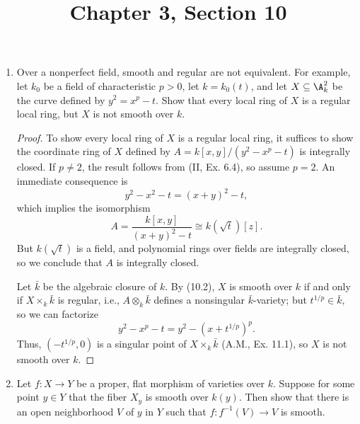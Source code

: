 \documentclass[a4paper]{article}
\title{Chapter 3, Section 10}
\begin{document}
\maketitle

\begin{enumerate} [label=\textbf{\arabic*.}, leftmargin=0em]

  \item Over a nonperfect field, smooth and regular are not equivalent.
        For example, let $k_0$ be a field of characteristic $p > 0$, let $k = k_0(t)$, and let $X \subseteq \A_k^2$ be the curve defined by $y^2 = x^p - t$.
        Show that every local ring of $X$ is a regular local ring, but $X$ is not smooth over $k$.

        \begin{proof}
          To show every local ring of $X$ is a regular local ring, it suffices to show the coordinate ring of $X$ defined by $A = k[x, y] / (y^2 - x^p - t)$ is integrally closed.
          If $p \neq 2$, the result follows from (II, Ex. 6.4), so assume $p = 2$.
          An immediate consequence is
          \begin{equation*}
            y^2 - x^2 - t = (x + y)^2 - t,
          \end{equation*}
          which implies the isomorphism
          \begin{equation*}
            A = \frac{k[x, y]}{(x + y)^2 - t} \cong k(\sqrt{t})[z].
          \end{equation*}
          But $k(\sqrt{t})$ is a field, and polynomial rings over fields are integrally closed, so we conclude that $A$ is integrally closed.

          Let $\bar{k}$ be the algebraic closure of $k$.
          By (10.2), $X$ is smooth over $k$ if and only if $X \times_k \bar{k}$ is regular, i.e., $A \otimes_k \bar{k}$ defines a nonsingular $\bar{k}$-variety; but $t^{1/p} \in \bar{k}$, so we can factorize
          \begin{equation*}
            y^2 - x^p - t = y^2 - (x + t^{1/p})^p.
          \end{equation*}
          Thus, $(-t^{1/p}, 0)$ is a singular point of $X \times_k \bar{k}$ (A.M., Ex. 11.1), so $X$ is not smooth over $k$.
        \end{proof}

  \item Let $f : X \to Y$ be a proper, flat morphism of varieties over $k$. Suppose for some point $y \in Y$ that the fiber $X_y$ is smooth over $k(y)$. Then show that there is an open neighborhood $V$ of $y$ in $Y$ such that $f : f^{-1}(V) \to V$ is smooth.


\end{enumerate}
\end{document}
